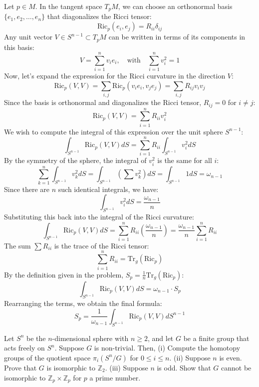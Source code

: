 \begin{solution}
Let $p \in M$. In the tangent space $T_p M$, we can choose an orthonormal basis $\{e_1, e_2, \dots, e_n\}$ that diagonalizes the Ricci tensor:
\[ \mathrm{Ric}_p(e_i, e_j) = R_{ii} \delta_{ij} \]
Any unit vector $V \in S^{n-1} \subset T_p M$ can be written in terms of its components in this basis:
\[ V = \sum_{i=1}^n v_i e_i, \quad \text{with} \quad \sum_{i=1}^n v_i^2 = 1 \]
Now, let's expand the expression for the Ricci curvature in the direction $V$:
\[ \mathrm{Ric}_p(V, V) = \sum_{i,j} \mathrm{Ric}_p(v_i e_i, v_j e_j) = \sum_{i,j} R_{ij} v_i v_j \]
Since the basis is orthonormal and diagonalizes the Ricci tensor, $R_{ij} = 0$ for $i \neq j$:
\[ \mathrm{Ric}_p(V, V) = \sum_{i=1}^n R_{ii} v_i^2 \]
We wish to compute the integral of this expression over the unit sphere $S^{n-1}$:
\[ \int_{S^{n-1}} \mathrm{Ric}_p(V, V) dS = \sum_{i=1}^n R_{ii} \int_{S^{n-1}} v_i^2 dS \]
By the symmetry of the sphere, the integral of $v_i^2$ is the same for all $i$:
\[ \sum_{k=1}^n \int_{S^{n-1}} v_k^2 dS = \int_{S^{n-1}} \left(\sum v_k^2\right) dS = \int_{S^{n-1}} 1 dS = \omega_{n-1} \]
Since there are $n$ such identical integrals, we have:
\[ \int_{S^{n-1}} v_i^2 dS = \frac{\omega_{n-1}}{n} \]
Substituting this back into the integral of the Ricci curvature:
\[ \int_{S^{n-1}} \mathrm{Ric}_p(V, V) dS = \sum_{i=1}^n R_{ii} \left(\frac{\omega_{n-1}}{n}\right) = \frac{\omega_{n-1}}{n} \sum_{i=1}^n R_{ii} \]
The sum $\sum R_{ii}$ is the trace of the Ricci tensor:
\[ \sum_{i=1}^n R_{ii} = \mathrm{Tr}_g(\mathrm{Ric}_p) \]
By the definition given in the problem, $S_p = \frac{1}{n} \mathrm{Tr}_g(\mathrm{Ric}_p)$:
\[ \int_{S^{n-1}} \mathrm{Ric}_p(V, V) dS = \omega_{n-1} \cdot S_p \]
Rearranging the terms, we obtain the final formula:
\[ S_p = \frac{1}{\omega_{n-1}} \int_{S^{n-1}} \mathrm{Ric}_p(V, V) dS^{n-1} \]
\end{solution}

\begin{exercise}
\label{geometry:2024:5}
Let $S^n$ be the $n$-dimensional sphere with $n \ge 2$, and let $G$ be a finite group that acts freely on $S^n$. Suppose $G$ is non-trivial. Then,
(i) Compute the homotopy groups of the quotient space $\pi_i(S^n/G)$ for $0 \le i \le n$.
(ii) Suppose $n$ is even. Prove that $G$ is isomorphic to $\mathbb{Z}_2$.
(iii) Suppose $n$ is odd. Show that $G$ cannot be isomorphic to $\mathbb{Z}_p \times \mathbb{Z}_p$ for $p$ a prime number.
\end{exercise}

